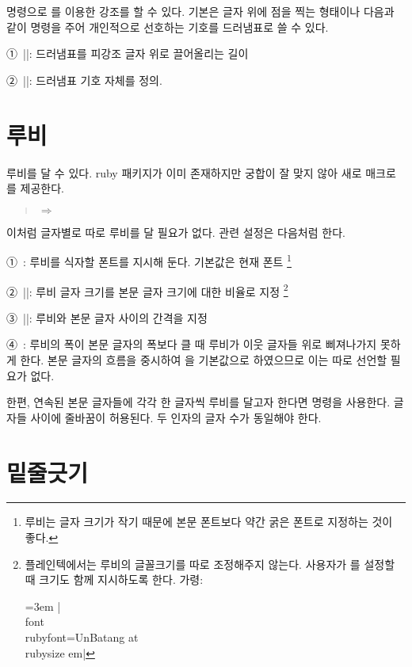 \documentclass[a4paper]{article}
\def\luatex{\hologo{LuaTeX}}
\def\logoko{\textsf{k}\kern-.0625em\textit{o}}
\def\luatexko{\luatex-\logoko}
\begin{document}
 명령으로 %
를 이용한 강조를 할 수 있다.  기본은 글자 위에 점을 찍는 형태이나
다음과 같이 명령을 주어 개인적으로 선호하는 기호를 드러냄표로 쓸 수
있다.

\medskip
①~|\def\dotemphraise{0.4em }|: 드러냄표를 피강조 글자 위로 끌어올리는 길이

②~|\def\dotemphchar{\bfseries ^^^^02d9}|: 드러냄표 기호 자체를 정의.

\section{루비}\label{sec:ruby}

루비를 달 수 있다. ruby 패키지가 이미 존재하지만  궁합이 잘
맞지 않아 새로 매크로를 제공한다.
\begin{quote}
  \quad$\Rightarrow$\quad{}
\end{quote}
이처럼 글자별로 따로 루비를 달 필요가 없다.  관련 설정은 다음처럼
한다.

\medskip
①~: 루비를 식자할 폰트를 지시해 둔다. 기본값은 현재 폰트%
\footnote{%
  루비는 글자 크기가 작기 때문에 본문 폰트보다 약간 굵은 폰트로
  지정하는 것이 좋다. }

②~|\def\rubysize{0.6}|: 루비 글자 크기를 본문 글자 크기에 대한 비율로
지정%
\footnote{%
  플레인텍에서는 루비의 글꼴크기를 따로 조정해주지 않는다.
  사용자가 를 설정할 때 크기도 함께 지시하도록 한다.
  가령:\par
  \leftskip=3em\noindent
  |\\font\\rubyfont=UnBatang at \\rubysize em| }

③~|\def\rubysep{0.1ex}|: 루비와 본문 글자 사이의 간격을 지정

④~: 루비의 폭이 본문 글자의 폭보다 클 때 루비가 이웃
글자들 위로 삐져나가지 못하게 한다. 본문 글자의 흐름을 중시하여
을 기본값으로 하였으므로 이는 따로 선언할 필요가 없다.

\medskip
한편, 연속된 본문 글자들에 각각 한 글자씩 루비를 달고자 한다면
 명령을 사용한다. 글자들 사이에 줄바꿈이 허용된다.
두 인자의 글자 수가 동일해야 한다.

\section{밑줄긋기}\label{sec:uline}
\end{document}
